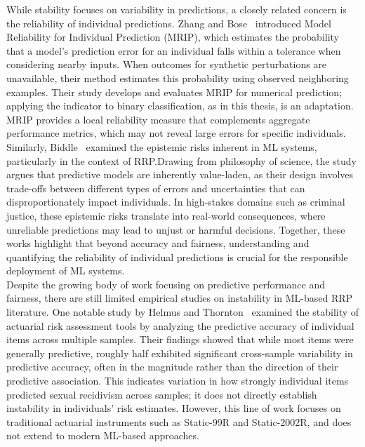 \documentclass[12pt]{article}
\begin{document}
While stability focuses on variability in predictions, a closely related concern is the reliability of individual predictions. Zhang and Bose~\cite{zhang2024reliability} introduced Model Reliability for Individual Prediction (MRIP), which estimates the probability that a model's prediction error for an individual falls within a tolerance when considering nearby inputs. When outcomes for synthetic perturbations are unavailable, their method estimates this probability using observed neighboring examples. Their study develops and evaluates MRIP for numerical prediction; applying the indicator to binary classification, as in this thesis, is an adaptation. MRIP provides a local reliability measure that complements aggregate performance metrics, which may not reveal large errors for specific individuals. Similarly, Biddle~\cite{biddle2022predicting} examined the epistemic risks inherent in ML systems, particularly in the context of RRP.\@ Drawing from philosophy of science, the study argues that predictive models are inherently value-laden, as their design involves trade-offs between different types of errors and uncertainties that can disproportionately impact individuals. In high-stakes domains such as criminal justice, these epistemic risks translate into real-world consequences, where unreliable predictions may lead to unjust or harmful decisions. Together, these works highlight that beyond accuracy and fairness, understanding and quantifying the reliability of individual predictions is crucial for the responsible deployment of ML systems.\\

Despite the growing body of work focusing on predictive performance and fairness, there are still limited empirical studies on instability in ML-based RRP literature. One notable study by Helmus and Thornton~\cite{helmus2015stability} examined the stability of actuarial risk assessment tools by analyzing the predictive accuracy of individual items across multiple samples. Their findings showed that while most items were generally predictive, roughly half exhibited significant cross-sample variability in predictive accuracy, often in the magnitude rather than the direction of their predictive association. This indicates variation in how strongly individual items predicted sexual recidivism across samples; it does not directly establish instability in individuals' risk estimates. However, this line of work focuses on traditional actuarial instruments such as Static-99R and Static-2002R, and does not extend to modern ML-based approaches.\\
\end{document}
